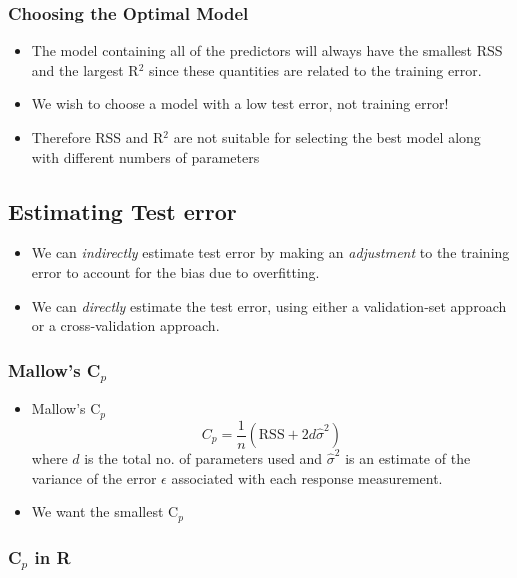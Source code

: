 \documentclass{article}
\begin{document}
\subsubsection{Choosing the Optimal Model}
\begin{itemize}
    \item The model containing all of the predictors will always have the smallest RSS and the largest R$^2$ since these quantities are related to the training error.
    \item We wish to choose a model with a low test error, not training error!
    \item Therefore RSS and R$^2$ are not suitable for selecting the best model along with different numbers of parameters
\end{itemize}

\subsection{Estimating Test error}
\begin{itemize}
  \item We can \emph{indirectly} estimate test error by making an \emph{adjustment} to the training error to account for the bias due to overfitting.
  \item We can \emph{directly} estimate the test error, using either a validation‐set approach or a cross‐validation approach.
\end{itemize}

\subsubsection{Mallow's C$_p$}
\begin{itemize}
    \item Mallow's C$_p$
    \begin{equation*}
        C_p = \frac{1}{n}(\mathrm{RSS} + 2 d \hat{\sigma}^2)
    \end{equation*}
    where $d$ is the total no. of parameters used and $\hat{\sigma}^2$ is an estimate of the variance of the error $\epsilon$ associated with each response measurement.
    \item We want the smallest C$_p$
\end{itemize}

\subsubsection{C$_p$ in R}
\end{document}
